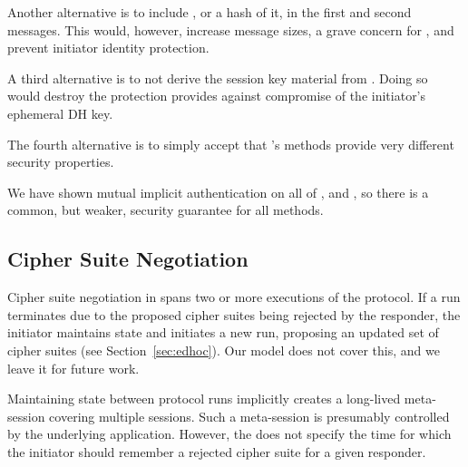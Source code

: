 \documentclass[runningheads, envcountsame, a4paper, draft, x11names]{llncs}
\begin{document}
Another alternative is to include \mGi{}, or a hash of it, in the first and
second messages.
%
This would, however, increase message sizes, a grave concern for \mEdhoc{},
and prevent initiator identity protection.
%
%

A third alternative is to not derive the session key material from \mGiy{}.
%
Doing so would destroy the protection \mOptls{} provides against compromise
of the initiator's ephemeral DH key.
%

The fourth alternative is to simply
accept that \mEdhoc{}'s methods provide very different security properties.
%

We have shown mutual implicit authentication on all of \mGxy{}, \mGiy{} and
\mGrx{}, so there is a common, but weaker, security guarantee for all
methods.
%

\subsection{Cipher Suite Negotiation}
\label{sec:ciphersuiteNegotiation}
%
Cipher suite negotiation in \mEdhoc{} spans two or more executions of the
protocol.
%
If a run terminates due to the proposed cipher suites being rejected by the
responder, the initiator maintains state and initiates a new run, proposing
an updated set of cipher suites (see Section~\ref{sec:edhoc}).
%
Our model does not cover this, and we leave it for future work.

Maintaining state between protocol runs implicitly creates a long-lived
meta-session covering multiple \mEdhoc{} sessions.
%
Such a meta-session is presumably controlled by the underlying application.
%
However, the \mSpec{} does not specify the time for which the initiator should
remember a rejected cipher suite for a given responder.
%
\end{document}

